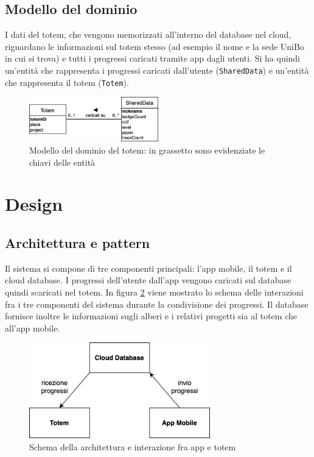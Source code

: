 \subsection{Modello del dominio}
I dati del totem, che vengono memorizzati all'interno del database nel cloud, riguardano le informazioni sul totem stesso (ad esempio il nome e la sede UniBo in cui si trova) e tutti i progressi caricati tramite app dagli utenti.
Si ha quindi un'entità che rappresenta i progressi caricati dall'utente (\texttt{SharedData}) e un'entità che rappresenta il totem (\texttt{Totem}).
\begin{figure}[h!]
    \centering
    \includegraphics[width=0.5\textwidth]{img/totem/totemDomain.png}
    \caption[Modello del dominio del totem]{Modello del dominio del totem: in grassetto sono evidenziate le chiavi delle entità}
    \label{fig:totemDomain}
\end{figure}
%
%
%
%
\section{Design}
\subsection{Architettura e pattern}
Il sistema si compone di tre componenti principali: l'app mobile, il totem e il cloud database. I progressi dell'utente dall'app vengono caricati sul database quindi scaricati nel totem. In figura \ref{fig:communication-schema} viene mostrato lo schema delle interazioni fra i tre componenti del sistema durante la condivisione dei progressi.
Il database fornisce inoltre le informazioni sugli alberi e i relativi progetti sia al totem che all'app mobile.
\begin{figure} [h]
    \centering
    \includegraphics[width=0.7\textwidth]{img/arch-totem-app-dati.png}
    \caption{Schema della architettura e interazione fra app e totem}
    \label{fig:communication-schema}
\end{figure}


